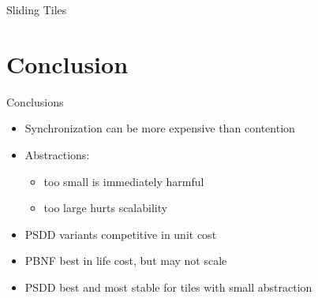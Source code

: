 \documentclass[style=unh]{powerdot}
\begin{document}

\begin{slide}{Sliding Tiles}
\end{slide}


\section{Conclusion}


\begin{slide}{Conclusions}
  \begin{itemize}
  \item Synchronization can be more expensive than contention
  \item Abstractions:
    \begin{itemize}
    \item too small is immediately harmful
    \item too large hurts scalability
    \end{itemize}
  \item PSDD variants competitive in unit cost
  \item PBNF best in life cost, but may not scale
  \item PSDD best and most stable for tiles with small abstraction
  \end{itemize}
\end{slide}
\end{document}
